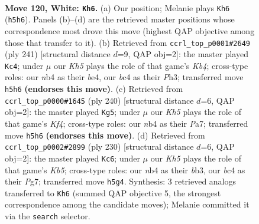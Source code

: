 \documentclass[11pt]{article}
\begin{document}
\clearpage

\begin{figure}[p]\centering
\begin{subfigure}{0.46\textwidth}\centering
\resizebox{\linewidth}{!}{%
\newchessgame
\chessboard[
  setfen={1B5k/8/8/7K/1nb2P2/8/8/8 w - - 3 120},
  showmover=false,
  pgfstyle=straightmove, color=movearrow, markmove={h5-h6}
]}
\caption{}
\end{subfigure}\hfill
\begin{subfigure}{0.46\textwidth}\centering
\resizebox{\linewidth}{!}{%
\newchessgame
\chessboard[
  setfen={8/2b5/8/1k6/4B3/6pp/8/5K2 b - - 83 121},
  showmover=false,
  pgfstyle=straightmove, color=movearrow, markmove={b5-c4}
]}
\caption{}
\end{subfigure}
\\[4pt]
\begin{subfigure}{0.46\textwidth}\centering
\resizebox{\linewidth}{!}{%
\newchessgame
\chessboard[
  setfen={b4B2/P7/4k3/2P5/5K2/8/8/8 w - - 11 121},
  showmover=false,
  pgfstyle=straightmove, color=movearrow, markmove={f4-g5}
]}
\caption{}
\end{subfigure}\hfill
\begin{subfigure}{0.46\textwidth}\centering
\resizebox{\linewidth}{!}{%
\newchessgame
\chessboard[
  setfen={3k4/6P1/3P4/1K6/8/1b6/7B/8 w - - 15 116},
  showmover=false,
  pgfstyle=straightmove, color=movearrow, markmove={b5-c6}
]}
\caption{}
\end{subfigure}
\caption{\textbf{Move 120, White: \texttt{Kh6}.} (a) Our position; Melanie plays \texttt{Kh6} (\texttt{h5h6}). Panels (b)--(d) are the retrieved master positions whose correspondence most drove this move (highest QAP objective among those that transfer to it). (b) Retrieved from \texttt{ccrl\_top\_p0001\#2649} (ply 241) [structural distance $d$=9, QAP obj=2]: the master played \texttt{Kc4}; under $\mu$ our \emph{Kh5} plays the role of that game's \emph{Kb4}; cross-type roles: our \emph{n}b4 as their \emph{b}e4, our \emph{b}c4 as their \emph{P}h3; transferred move \texttt{h5h6} \textbf{(endorses this move)}. (c) Retrieved from \texttt{ccrl\_top\_p0000\#1645} (ply 240) [structural distance $d$=6, QAP obj=2]: the master played \texttt{Kg5}; under $\mu$ our \emph{Kh5} plays the role of that game's \emph{Kf4}; cross-type roles: our \emph{n}b4 as their \emph{P}a7; transferred move \texttt{h5h6} \textbf{(endorses this move)}. (d) Retrieved from \texttt{ccrl\_top\_p0002\#2899} (ply 230) [structural distance $d$=6, QAP obj=2]: the master played \texttt{Kc6}; under $\mu$ our \emph{Kh5} plays the role of that game's \emph{Kb5}; cross-type roles: our \emph{n}b4 as their \emph{b}b3, our \emph{b}c4 as their \emph{P}g7; transferred move \texttt{h5g4}. Synthesis: 3 retrieved analogs transferred to \texttt{Kh6} (summed QAP objective 5, the strongest correspondence among the candidate moves); Melanie committed it via the \texttt{search} selector.}
\label{fig:thought-m238}
\end{figure}
\end{document}

